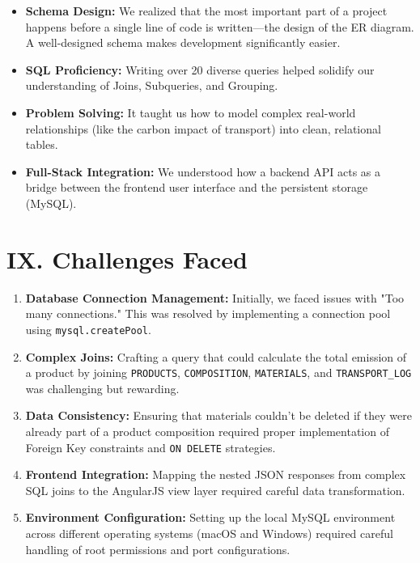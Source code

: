 \documentclass[12pt,a4paper]{article}
\begin{document}
\begin{itemize}
    \item \textbf{Schema Design:} We realized that the most important part of a project happens before a single line of code is written—the design of the ER diagram. A well-designed schema makes development significantly easier.
    \item \textbf{SQL Proficiency:} Writing over 20 diverse queries helped solidify our understanding of Joins, Subqueries, and Grouping.
    \item \textbf{Problem Solving:} It taught us how to model complex real-world relationships (like the carbon impact of transport) into clean, relational tables.
    \item \textbf{Full-Stack Integration:} We understood how a backend API acts as a bridge between the frontend user interface and the persistent storage (MySQL).
\end{itemize}

\vspace{1cm}
\section*{IX. Challenges Faced}

\begin{enumerate}
    \item \textbf{Database Connection Management:} Initially, we faced issues with "Too many connections." This was resolved by implementing a connection pool using \texttt{mysql.createPool}.
    \item \textbf{Complex Joins:} Crafting a query that could calculate the total emission of a product by joining \texttt{PRODUCTS}, \texttt{COMPOSITION}, \texttt{MATERIALS}, and \texttt{TRANSPORT\_LOG} was challenging but rewarding.
    \item \textbf{Data Consistency:} Ensuring that materials couldn't be deleted if they were already part of a product composition required proper implementation of Foreign Key constraints and \texttt{ON DELETE} strategies.
    \item \textbf{Frontend Integration:} Mapping the nested JSON responses from complex SQL joins to the AngularJS view layer required careful data transformation.
    \item \textbf{Environment Configuration:} Setting up the local MySQL environment across different operating systems (macOS and Windows) required careful handling of root permissions and port configurations.
\end{enumerate}
\end{document}
